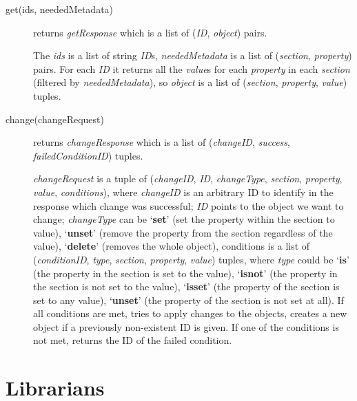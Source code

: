 \documentclass{book}
\begin{document}
\begin{description}
    \item [get(ids, neededMetadata)] returns \emph{getResponse} which is a list of (\emph{ID}, \emph{object}) pairs.

    The \emph{ids} is a list of string \emph{ID}s, \emph{neededMetadata} is a list of (\emph{section}, \emph{property}) pairs. For each \emph{ID} it returns all the \emph{value}s for each \emph{property} in each \emph{section} (filtered by \emph{neededMetadata}), so \emph{object} is a list of (\emph{section}, \emph{property}, \emph{value}) tuples.

    \item [change(changeRequest)] returns \emph{changeResponse} which is a list of (\emph{changeID}, \emph{success}, \emph{failedConditionID}) tuples.

    \emph{changeRequest} is a tuple of (\emph{changeID}, \emph{ID}, \emph{changeType}, \emph{section}, \emph{property}, \emph{value}, \emph{conditions}), where \emph{changeID} is an arbitrary ID to identify in the response which change was successful; \emph{ID} points to the object we want to change; \emph{changeType} can be `\textbf{set}' (set the property within the section to value), `\textbf{unset}' (remove the property from the section regardless of the value), `\textbf{delete}' (removes the whole object), conditions is a list of (\emph{conditionID}, \emph{type}, \emph{section}, \emph{property}, \emph{value}) tuples, where \emph{type} could be `\textbf{is}' (the property in the section is set to the value), `\textbf{isnot}' (the property in the section is not set to the value), `\textbf{isset}' (the property of the section is set to any value), `\textbf{unset}' (the property of the section is not set at all).
    If all conditions are met, tries to apply changes to the objects, creates a new object if a previously non-existent ID is given. If one of the conditions is not met, returns the ID of the failed condition.
\end{description}
    

\newpage

\section{Librarians} %
\label{sec:librarian}
\end{document}
